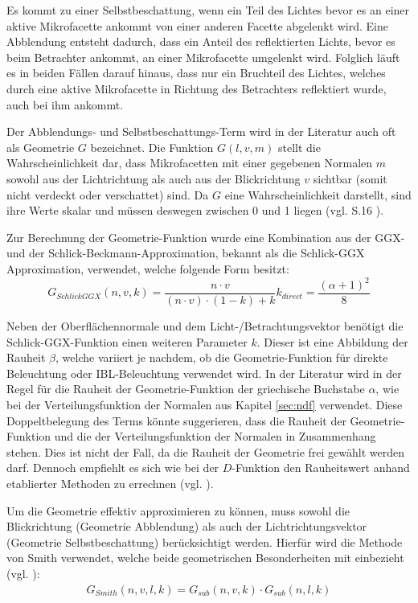 \documentclass[
  11pt,
  a4paper,
  oneside
  ]{article}
\begin{document}
Es kommt zu einer Selbstbeschattung, wenn ein Teil des Lichtes bevor es an einer aktive Mikrofacette ankommt von einer anderen Facette abgelenkt wird. Eine Abblendung entsteht dadurch, dass ein Anteil des reflektierten Lichts, bevor es beim Betrachter ankommt, an einer Mikrofacette umgelenkt wird. Folglich läuft es in beiden Fällen darauf hinaus, dass nur ein Bruchteil des Lichtes, welches durch eine aktive Mikrofacette in Richtung des Betrachters reflektiert wurde, auch bei ihm ankommt. 

Der Abblendungs- und Selbstbeschattungs-Term wird in der Literatur auch oft als Geometrie $G$ bezeichnet. Die Funktion $G(l, v, m)$ stellt die Wahrscheinlichkeit dar, dass Mikrofacetten mit einer gegebenen Normalen $m$ sowohl aus der Lichtrichtung als auch aus der Blickrichtung $v$ sichtbar (somit nicht verdeckt oder verschattet) sind. Da $G$ eine Wahrscheinlichkeit darstellt, sind ihre Werte skalar und müssen deswegen zwischen 0 und 1 liegen (vgl. S.16 \cite{rtrPaper}). 

Zur Berechnung der Geometrie-Funktion wurde eine Kombination aus der GGX- und der Schlick-Beckmann-Approximation, bekannt als die Schlick-GGX Approximation, verwendet, welche folgende Form besitzt: 
\begin{equation}
  G_{SchlickGGX}\left( n,v,k\right) =\dfrac{n\cdot v}{\left( n\cdot v\right) \cdot \left( 1-k\right) +k} %
  k_{direct}=\dfrac{\left( \alpha +1\right) ^{2}}{8} %
\end{equation}

Neben der Oberflächennormale und dem Licht-/Betrachtungsvektor benötigt die Schlick-GGX-Funktion einen weiteren Parameter $k$. Dieser ist eine Abbildung der Rauheit $\beta$, welche variiert je nachdem, ob die Geometrie-Funktion für direkte Beleuchtung oder IBL-Beleuchtung verwendet wird. In der Literatur wird in der Regel für die Rauheit der Geometrie-Funktion der griechische Buchstabe $\alpha$, wie bei der Verteilungsfunktion der Normalen aus Kapitel 
\ref{sec:ndf} verwendet. Diese Doppeltbelegung des Terms könnte suggerieren, dass die Rauheit der Geometrie-Funktion und die der Verteilungsfunktion der Normalen in Zusammenhang stehen. Dies ist nicht der Fall, da die Rauheit der Geometrie frei gewählt werden darf. Dennoch empfiehlt es sich wie bei der $D$-Funktion den Rauheitswert anhand etablierter Methoden zu errechnen (vgl. \cite{learnOpenGL}).

Um die Geometrie effektiv approximieren zu können, muss sowohl die Blickrichtung (Geometrie Abblendung) als auch der Lichtrichtungsvektor (Geometrie Selbstbeschattung) berücksichtigt werden. Hierfür wird die Methode von Smith verwendet, welche beide geometrischen Besonderheiten mit einbezieht (vgl. \cite{learnOpenGL}): 
\begin{eqnarray}
  G_{Smith}\left( n,v,l,k\right) =G_{sub}\left( n,v,k\right) \cdot G_{sub}\left( n,l,k\right)
\end{eqnarray}
\end{document}
